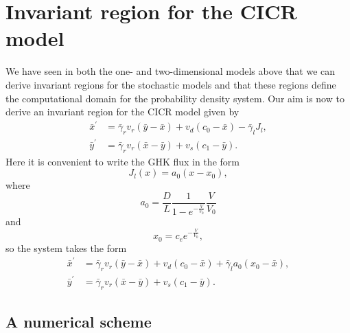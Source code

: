 \section{Invariant region for the CICR model}

We have seen in both the one- and two-dimensional models above that we can derive invariant
regions for the stochastic models and that these regions define the
computational domain for the probability density system. Our aim is now to
derive an invariant region for the CICR model given by%
\begin{align}
\bar{x}^{\prime}  &  =\bar{\gamma}_{r}v_{r}\left(  \bar{y}-\bar{x}\right)
+v_{d}\left(  c_{0}-\bar{x}\right)  -\bar{\gamma}_{l}J_{l},\label{c1v2}\\
\bar{y}^{\prime}  &  =\bar{\gamma}_{r}v_{r}\left(  \bar{x}-\bar{y}\right)
+v_{s}\left(  c_{1}-\bar{y}\right)  . \label{c2v2}%
\end{align}
Here it is convenient to write the GHK flux in the form%
\[
J_{l}(x)=a_{0}(x-x_{0}),
\]
where%
\[
a_{0}=\frac{D}{L}\frac{1}{1-e^{-\frac{V}{V_{0}}}}\frac{V}{V_{0}}%
\]
and%
\[
x_{0}=c_{e}e^{-\frac{V}{V_{0}}},
\]
so the system takes the form%
\begin{align}
\bar{x}^{\prime}  &  =\bar{\gamma}_{r}v_{r}\left(  \bar{y}-\bar{x}\right)
+v_{d}\left(  c_{0}-\bar{x}\right)  +\bar{\gamma}_{l}a_{0}(x_{0}-\bar
{x}),\label{xc1v2}\\
\bar{y}^{\prime}  &  =\bar{\gamma}_{r}v_{r}\left(  \bar{x}-\bar{y}\right)
+v_{s}\left(  c_{1}-\bar{y}\right)  . \label{yc2v2}%
\end{align}


\subsection{A numerical scheme}

